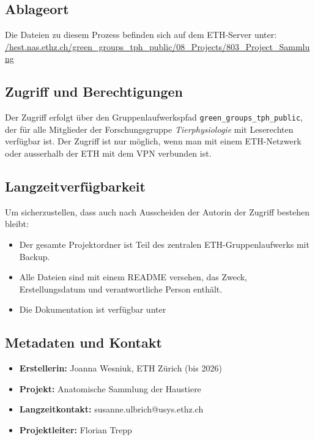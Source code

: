 \subsection{Ablageort}
Die Dateien zu diesem Prozess befinden sich auf dem ETH-Server unter:  
\url{/hest.nas.ethz.ch/green_groups_tph_public/08_Projects/803_Project_Sammlung}

\subsection{Zugriff und Berechtigungen}
Der Zugriff erfolgt über den Gruppenlaufwerkspfad 
\texttt{green\_groups\_tph\_public}, der für alle Mitglieder der Forschungsgruppe \emph{Tierphysiologie} mit Leserechten verfügbar ist.  Der Zugriff ist nur möglich, wenn man mit einem ETH-Netzwerk oder ausserhalb der ETH mit dem VPN verbunden ist.

\subsection{Langzeitverfügbarkeit}
Um sicherzustellen, dass auch nach Ausscheiden der Autorin der Zugriff bestehen bleibt:
\begin{itemize}
    \item Der gesamte Projektordner ist Teil des zentralen ETH-Gruppenlaufwerks mit Backup.
    \item Alle Dateien sind mit einem README versehen, das Zweck, Erstellungsdatum und verantwortliche Person enthält.
    \item Die Dokumentation ist verfügbar unter 
\end{itemize}

\subsection{Metadaten und Kontakt}
\begin{itemize}
    \item \textbf{Erstellerin:} Joanna Wesniuk, ETH Zürich (bis 2026)
    \item \textbf{Projekt:} Anatomische Sammlung der Haustiere
    \item \textbf{Langzeitkontakt:} susanne.ulbrich@usys.ethz.ch
    \item \textbf{Projektleiter:} Florian Trepp
\end{itemize}


